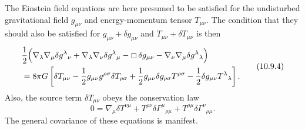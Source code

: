 The Einstein field equations are here presumed to be satisfied for the
undisturbed gravitational field \(g_{\mu\nu}\) and energy-momentum tensor
\(T_{\mu\nu}\). The condition that they should also be satisfied for
\(g_{\mu\nu}+\delta g_{\mu\nu}\) and
\(T_{\mu\nu}+\delta T_{\mu\nu}\) is then
\begin{equation}
  \begin{split}
  \frac12\Bigl(
    &\nabla_\lambda\nabla_\mu
      \delta g^\lambda{}_\nu
    +\nabla_\lambda\nabla_\nu
      \delta g^\lambda{}_\mu
    -\Box\,\delta g_{\mu\nu}
    -\nabla_\nu\nabla_\mu
      \delta g^\lambda{}_\lambda
  \Bigr)
  \\
  ={}&
  8\pi G
  \left[
    \delta T_{\mu\nu}
    -\frac12g_{\mu\nu}g^{\rho\sigma}\delta T_{\rho\sigma}
    +\frac12g_{\mu\nu}\delta g_{\rho\sigma}T^{\rho\sigma}
    -\frac12\delta g_{\mu\nu}T^\lambda{}_\lambda
  \right].
  \end{split}
  \tag{10.9.4}\label{eq:10.9.4}
\end{equation}
Also, the source term \(\delta T_{\mu\nu}\) obeys the conservation law
\begin{equation}
  0
  =
  \nabla_\mu\delta T^{\nu\mu}
  +T^{\rho\nu}\delta\Gamma^\mu{}_{\rho\mu}
  +T^{\rho\mu}\delta\Gamma^\nu{}_{\rho\mu}.
  \tag{10.9.5}\label{eq:10.9.5}
\end{equation}
The general covariance of these equations is manifest.

